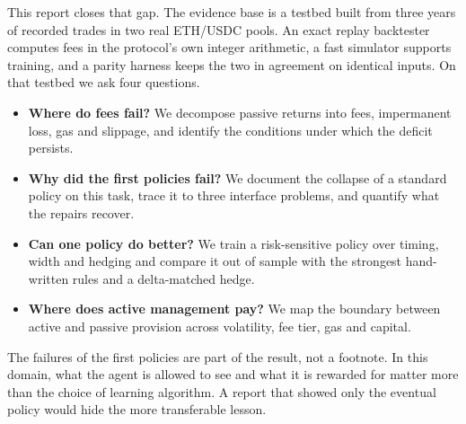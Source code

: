 This report closes that gap. The evidence base is a testbed built from three
years of recorded trades in two real ETH/USDC pools. An exact replay backtester
computes fees in the protocol's own integer arithmetic, a fast simulator
supports training, and a parity harness keeps the two in agreement on identical
inputs. On that testbed we ask four questions.

\begin{itemize}
\item \textbf{Where do fees fail?} We decompose passive returns into fees,
impermanent loss, gas and slippage, and identify the conditions under which the
deficit persists.
\item \textbf{Why did the first policies fail?} We document the collapse of a
standard policy on this task, trace it to three interface problems, and
quantify what the repairs recover.
\item \textbf{Can one policy do better?} We train a risk-sensitive policy over
timing, width and hedging and compare it out of sample with the strongest
hand-written rules and a delta-matched hedge.
\item \textbf{Where does active management pay?} We map the boundary between
active and passive provision across volatility, fee tier, gas and capital.
\end{itemize}

The failures of the first policies are part of the result, not a footnote. In
this domain, what the agent is allowed to see and what it is rewarded for
matter more than the choice of learning algorithm. A report that showed only
the eventual policy would hide the more transferable lesson.
